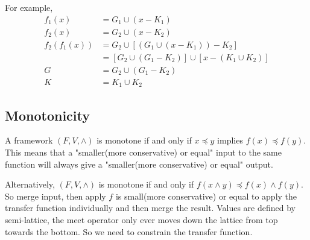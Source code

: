 For example, 
\begin{align*} 
    f_1(x) &= G_1 \cup (x - K_1)\\
    f_2(x) &= G_2 \cup (x - K_2) \\
    f_2(f_1(x)) &= G_2 \cup [(G_1 \cup (x - K_1)) - K_2] \\
    & = [G_2 \cup (G_1 - K_2)] \cup [x-(K_1 \cup K_2)] \\
    G &= G_2 \cup (G_1 - K_2) \\
    K &= K_1 \cup K_2
\end{align*}


\subsection{Monotonicity}


A framework \((F,V,\wedge)\) is monotone if and only if \(x \preceq y \) implies \(f(x) \preceq f(y)\). This means that
a "smaller(more conservative) or equal" input to the same function will always give a "smaller(more conservative)  or equal" output.



Alternatively, \((F,V,\wedge)\) is monotone if and only if \(  f(x \wedge y) \preceq f(x) \wedge f(y)\). So  merge input, then apply \(f\) is small(more conservative)  or equal to apply the transfer
function individually and then merge the result. Values are defined by semi-lattice, the meet operator only ever moves down the lattice from top towards the bottom. 
So we need to constrain the transfer function.



\subsection{}











































